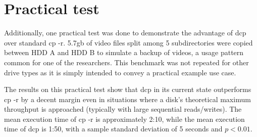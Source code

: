 \documentclass[12pt]{article}
\begin{document}
\vspace{5mm}

\section{Practical test}
Additionally, one practical test was done to demonstrate the advantage
of dcp over standard cp -r. 5.7gb of video files split among 5 subdirectories were copied between
HDD A and HDD B to simulate a backup of videos, a usage pattern common for one of the researchers.
This benchmark was not repeated for other drive types as it is simply intended to convey a practical example use
case.

The results on this practical test show that dcp in its current state outperforms cp -r by a decent margin even
in situations where a disk's theoretical maximum throughput is approached (typically with large sequential reads/writes).
The mean execution time of cp -r is approximately 2:10, while the mean execution time of dcp is 1:50, with a sample standard deviation of
5 seconds and $p < 0.01$.
\end{document}
